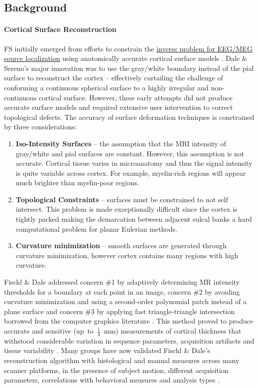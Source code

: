 \documentclass[paper=a4, fontsize=11pt]{scrartcl} %
\numberwithin{equation}{section} %
\numberwithin{figure}{section} %
\numberwithin{table}{section} %
\begin{document}
\subsection{Background}
\paragraph{Cortical Surface Reconstruction} FS initially emerged from efforts to constrain the \href{http://www.scholarpedia.org/article/Source_localization}{inverse problem for EEG/MEG source localization} using anatomically accurate cortical surface models \cite{dale_improved_1993}.  Dale \& Sereno's major innovation was to use the gray/white boundary instead of the pial surface to reconstruct the cortex -- effectively curtailing the challenge of conforming a continuous spherical surface to a highly irregular and non-continuous cortical surface.  However, these early attempts did not produce accurate surface models and required extensive user intervention to correct topological defects. The accuracy of surface deformation techniques is constrained by three considerations:
\begin{enumerate}
\item \textbf{Iso-Intensity Surfaces} -- the assumption that the MRI intensity of gray/white and pial surfaces are constant. However, this assumption is not accurate. Cortical tissue varies in microanatomy and thus the signal intensity is quite variable across cortex.  For example, myelin-rich regions will appear much brighter than myelin-poor regions.
\item \textbf{Topological Constraints} -- surfaces must be constrained to not self intersect.  This problem is made exceptionally difficult since the cortex is tightly packed making the demarcation between adjacent sulcal banks a hard computational problem for planar Eulerian methods.
\item \textbf{Curvature minimization} -- smooth surfaces are generated through curvature minimization, however cortex contains many regions with high curvature.
\end{enumerate}

Fischl \& Dale addressed concern \#1 by adaptively determining MR intensity thresholds for a boundary at each point in an image, concern \#2 by avoiding curvature minimization and using a second-order polynomial patch instead of a plane surface and concern \#3 by applying fast triangle-triangle intersection borrowed from the computer graphics literature \cite{fischl_measuring_2000}.  This method proved to produce accurate and sensitive \mbox{(up to $\frac{1}{4}$ mm)} measurements of cortical thickness that withstood considerable variation in sequence parameters, acquisition artifacts and tissue variability \cite{fischl_automated_2001}.  Many groups have now validated Fischl \& Dale's reconstruction algorithm with histological and manual measures across many scanner platforms, in the presence of subject motion, different acquisition parameters, correlations with behavioral measures and analysis types \cite{dickerson_detection_2008,  han_reliability_2006, rosas_regional_2002, ReutEtal14, vonEconomo}.  
\end{document}
